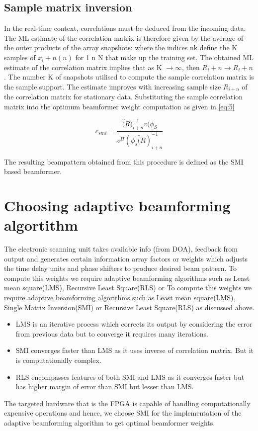 \subsection{Sample matrix inversion}
In the real-time context, correlations must be deduced from the incoming data. The ML estimate of the correlation matrix is therefore given by the average of the outer products of the array snapshots: where the indices nk define the K samples of $x_{i} + n(n)$ for 1 n N that make up the training set. The obtained ML estimate of the correlation matrix implies that as K $\rightarrow \infty$, then $R_{i}+n \rightarrow R_{i}+n$. The number K of snapshots utilised to compute the sample correlation matrix is the sample support. The estimate improves with increasing sample size $R_{i+n}$ of the correlation matrix for stationary data. Substituting the sample correlation matrix into the optimum beamformer weight computation as given in \ref{eq:5}

\begin{equation} \label{eq:5}
c_{smi} = \dfrac{\hat(R)_{i+n}^{-1}v(\phi_{S}}{v^{H}(\phi_{s}\hat(R)_{i+n}^{-1}}
\end{equation}


The resulting beampattern obtained from this procedure is defined as the SMI based beamformer.

\section{Choosing adaptive beamforming algortithm}
The electronic scanning unit takes available info (from DOA), feedback from output and generates certain information array factors or weights which adjusts the time delay units and phase shifters to produce desired beam pattern. To compute this weights we require  adaptive beamforming algorithms such as Least mean square(LMS), Recursive Least Square(RLS) or To compute this weights we require  adaptive beamforming algorithms such as Least mean square(LMS), Single Matrix Inversion(SMI) or Recursive Least Square(RLS) as discussed above.

\begin{itemize}
\item LMS is an iterative process which corrects its output by considering the error from previous data but to converge it requires many iterations.
\item SMI  converges faster than LMS as it uses inverse of correlation matrix. But it is computationally complex.
\item RLS encompasses features of both SMI and LMS as it converges faster but has higher margin of error than SMI but lesser than LMS.
\end{itemize}
The targeted hardware that is the FPGA is capable of handling computationally expensive operations and hence, we choose SMI for the implementation of the adaptive beamforming algorithm to get optimal beamformer weights.

